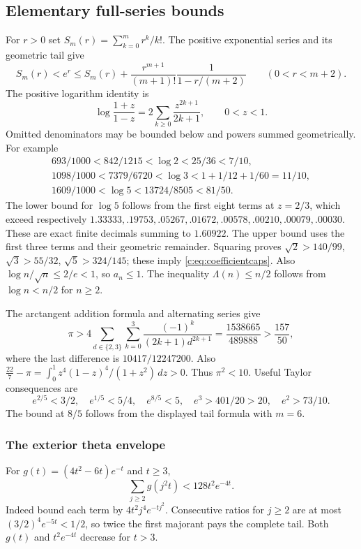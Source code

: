 \documentclass[11pt,a4paper]{article}
\numberwithin{equation}{section}
\theoremstyle{definition}\newtheorem{definition}[theorem]{Definition}
\theoremstyle{remark}\newtheorem{remark}[theorem]{Remark}
\begin{document}
\subsection{Elementary full-series bounds}\label{c:app:scalar}
For $r>0$ set $S_m(r)=\sum_{k=0}^m r^k/k!$.
The positive exponential series and its geometric tail give
\[
 S_m(r)<e^r\le S_m(r)+\frac{r^{m+1}}{(m+1)!}
                  \frac1{1-r/(m+2)}\qquad(0<r<m+2).
\]
The positive logarithm identity is
\begin{equation}\label{c:eq:atanh}
 \log\frac{1+z}{1-z}=2\sum_{k\ge0}\frac{z^{2k+1}}{2k+1},
 \qquad0<z<1.
\end{equation}
Omitted denominators may be bounded below and powers summed geometrically.
For example
\begin{gather*}
 693/1000<842/1215<\log2<25/36<7/10,\\
 1098/1000<7379/6720<\log3<1+1/12+1/60=11/10,\\
 1609/1000<\log5<13724/8505<81/50.
\end{gather*}
The lower bound for $\log5$ follows from the first eight terms at $z=2/3$,
which exceed respectively
$1.33333,.19753,.05267,.01672,.00578,.00210,.00079,.00030$.
These are exact finite decimals summing to $1.60922$.
The upper bound uses the first three terms and their geometric remainder.
Squaring proves
$\sqrt2>140/99$, $\sqrt3>55/32$, $\sqrt5>324/145$;
these imply \eqref{c:eq:coefficientcaps}.
Also $\log n/\sqrt n\le2/e<1$, so $a_n\le1$.
The inequality $\Lambda(n)\le n/2$ follows from $\log n<n/2$ for $n\ge2$.

The arctangent addition formula and alternating series give
\[
 \pi>4\sum_{d\in\{2,3\}}\sum_{k=0}^3
       \frac{(-1)^k}{(2k+1)d^{2k+1}}
 =\frac{1538665}{489888}>\frac{157}{50},
\]
where the last difference is $10417/12247200$.
Also
$\frac{22}{7}-\pi=\int_0^1z^4(1-z)^4/(1+z^2)\,dz>0$.
Thus $\pi^2<10$.
Useful Taylor consequences are
\[
 e^{2/5}<3/2,\quad e^{1/5}<5/4,\quad
 e^{8/5}<5,\quad e^3>401/20>20,\quad e^2>73/10.
\]
The bound at $8/5$ follows from the displayed tail formula with $m=6$.

\subsubsection{The exterior theta envelope}
For $g(t)=(4t^2-6t)e^{-t}$ and $t\ge3$,
\begin{equation}\label{c:eq:thetatotal}
 \sum_{j\ge2}g(j^2t)<128t^2e^{-4t}.
\end{equation}
Indeed bound each term by $4t^2j^4e^{-tj^2}$.
Consecutive ratios for $j\ge2$ are at most
$(3/2)^4e^{-5t}<1/2$, so twice the first majorant pays the complete tail.
Both $g(t)$ and $t^2e^{-4t}$ decrease for $t>3$.
\end{document}
